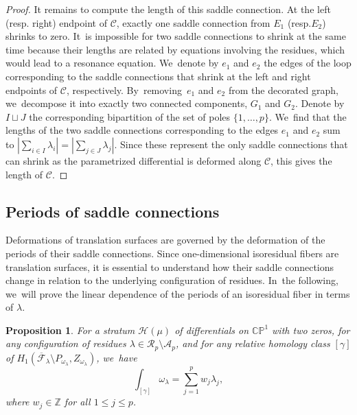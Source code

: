 \documentclass[11pt]{article}
\newcommand{\resp}{resp.\xspace}
\newtheorem{prop}[thm]{Proposition}
\theoremstyle{definition}
\begin{document}
\begin{proof}
It remains to compute the length of this saddle connection. At the left (\resp right) endpoint of $\mathcal{C}$, exactly one saddle connection from $E_{1}$ (\resp $E_{2}$) shrinks to zero. It~is impossible for two saddle connections to shrink at the same time because their lengths are related by equations involving the residues, which would lead to a resonance equation. We~denote by $e_{1}$ and $e_{2}$ the edges of the loop corresponding to the saddle connections that shrink at the left and right endpoints of $\mathcal{C}$, respectively. By~removing~$e_{1}$ and $e_{2}$ from the decorated graph, we~decompose it into exactly two connected components, $G_{1}$ and $G_{2}$. Denote by $I \sqcup J$ the corresponding bipartition of the set of poles $\lbrace{ 1,\dots,p \rbrace}$. We~find that the lengths of the two saddle connections corresponding to the edges $e_{1}$ and $e_{2}$ sum to $|\sum_{i \in I} \lambda_{i}|=|\sum_{j \in J} \lambda_{j}|$. Since these represent the only saddle connections that can shrink as the parametrized differential is deformed along $\mathcal{C}$, this gives the length of $\mathcal{C}$.
\end{proof}

\subsection{Periods of saddle connections}

Deformations of translation surfaces are governed by the deformation of the periods of their saddle connections. Since one-dimensional isoresidual fibers are translation surfaces, it is essential to understand how their saddle connections change in relation to the underlying configuration of residues. In~the following, we~will prove the linear dependence of the periods of an isoresidual fiber in terms of $\lambda$.

\begin{prop}\label{prop:IntegerWeights}
For a stratum $\mathcal{H}(\mu)$ of differentials on $\mathbb{C}\mathbb{P}^1$ with two zeros, for any configuration of residues $\lambda \in \mathcal{R}_{p} \setminus \mathcal{A}_{p}$, and for any relative homology class $[\gamma]$ of $H_{1}(\overline{\mathcal{F}}_{\lambda} \setminus P_{\omega_{\lambda}}, Z_{\omega_{\lambda}})$, we~have\vspace*{-5pt}
\[
\int_{[\gamma]} \omega_{\lambda} = \sum_{j=1}^{p} w_{j}\lambda_{j},
\]
where $w_{j} \in \mathbb{Z}$ for all $1 \leq j \leq p$.
\end{prop}
\end{document}
